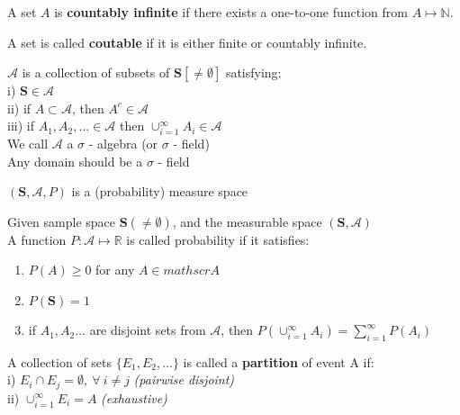 \documentclass[14pt, oneside, letterpaper]{notes}
\begin{document}
\begin{mydef}
	A set $A$ is \textbf{countably infinite} if there exists a one-to-one
	function from $A \mapsto \mathbb{N}$.
\end{mydef}

\begin{mydef}
	A set is called \textbf{coutable} if it is either finite or countably 
	infinite.
\end{mydef}

%
%

\begin{mydef}
	$\mathscr{A}$ is a collection of subsets of $\textbf{S}[\neq \emptyset]$
	satisfying: \\
	\indent i) $\textbf{S} \in \mathscr{A}$ \\
	\indent ii) if $ A \subset \mathscr{A}$, then $A^c \in \mathscr{A}$ \\
	\indent iii) if $A_1, A_2, ... \in \mathscr{A}$ then 
	$\cup_{i=1}^{\infty} A_i \in \mathscr{A} $ \\
	We call $\mathscr{A}$ a $\sigma$ - algebra (or $\sigma$ - field) \\
	Any domain should be a $\sigma$ - field
\end{mydef}

\begin{mydef}
	$(\textbf{S}, \mathscr{A}, P)$ is a (probability) measure space
\end{mydef}

\begin{mydef}
	Given sample space $\textbf{S} (\neq \emptyset)$, and the 
	measurable space $(\textbf{S}, \mathscr{A})$ \\
	A function $P: \mathscr{A} \mapsto \mathbb{R}$ is called 
	probability if it satisfies:
	\begin{enumerate}
		\item $P(A) \geq 0$ for any $A \in mathscr{A}$
		\item $P(\textbf{S}) = 1$
		\item if $A_1, A_2 ...$ are disjoint sets from $\mathscr{A}$,
		then $P(\cup_{i=1}^{\infty} A_i) = \sum_{i=1}^{\infty} P(A_i)$
	\end{enumerate}
\end{mydef}

%
%

\begin{mydef}
	A collection of sets $\{E_1, E_2, ...\}$ is called a \textbf{partition} 
		of event A if: \\
	\indent i) $E_i \cap E_j = \emptyset, \: \forall \: i \neq j$ 
		\textit{(pairwise disjoint)} \\
  	\indent ii) $\cup_{i=1}^{\infty}E_i = A$ 
		\textit{(exhaustive)}
\end{mydef}
\end{document}
